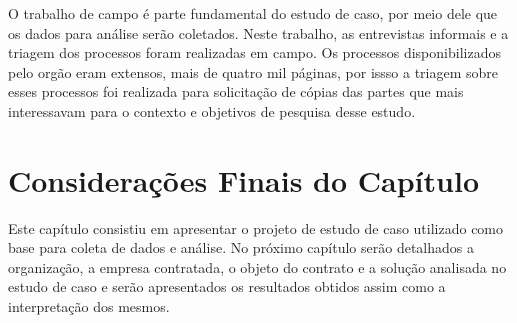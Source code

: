 O trabalho de campo é parte fundamental do estudo de caso, por meio dele que os dados para análise serão coletados. Neste trabalho, as entrevistas informais e a triagem dos processos foram realizadas em campo. Os processos disponibilizados pelo orgão eram extensos, mais de quatro mil páginas, por issso a triagem sobre esses processos foi realizada para solicitação de cópias das partes que mais interessavam para o contexto e objetivos de pesquisa desse estudo.

\section[Considerações Finais do Capítulo]{Considerações Finais do Capítulo}

Este capítulo consistiu em apresentar o projeto de estudo de caso utilizado como base para coleta de dados e análise. No próximo capítulo serão detalhados a organização, a empresa contratada, o objeto do contrato e a solução analisada no estudo de caso e serão apresentados os resultados obtidos assim como a interpretação dos mesmos.